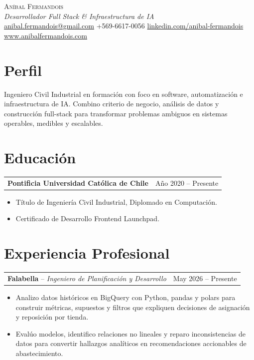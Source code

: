 \documentclass[10pt,letterpaper]{article}
\makeatletter
\newcommand{\entry}[4]{%
  \begin{tabularx}{\linewidth}{@{}Xr@{}}
    \textbf{#1} -- \textit{#2} & {\color{textgray}#3} \\
  \end{tabularx}
  #4
}
\makeatother
\begin{document}
\begin{center}
  {\fontsize{24}{25}\selectfont\scshape Aníbal Fermandois}\\
  \vspace{3pt}
  {\color{accent}\textit{Desarrollador Full Stack \& Infraestructura de IA}}\\
  \vspace{4pt}
  \href{mailto:anibal.fermandois@gmail.com}{anibal.fermandois@gmail.com} \quad
  +569-6617-0056 \quad
  \href{https://www.linkedin.com/in/anibal-fermandois-224ab4262/}{linkedin.com/anibal-fermandois} \quad
  \href{https://www.anibalfermandois.com/}{www.anibalfermandois.com}
\end{center}

\section{Perfil}
Ingeniero Civil Industrial en formación con foco en software, automatización e infraestructura de IA. Combino criterio de negocio, análisis de datos y construcción full-stack para transformar problemas ambiguos en sistemas operables, medibles y escalables.

\section{Educación}
\begin{tabularx}{\linewidth}{@{}Xr@{}}
\textbf{Pontificia Universidad Católica de Chile} & Año 2020 -- Presente \\
\end{tabularx}
\begin{itemize}
  \item Título de Ingeniería Civil Industrial, Diplomado en Computación.
  \item Certificado de Desarrollo Frontend Launchpad.
\end{itemize}

\section{Experiencia Profesional}
\entry{Falabella}{Ingeniero de Planificación y Desarrollo}{May 2026 -- Presente}{
\begin{itemize}
  \item Analizo datos históricos en BigQuery con Python, pandas y polars para construir métricas, supuestos y filtros que expliquen decisiones de asignación y reposición por tienda.
  \item Evalúo modelos, identifico relaciones no lineales y reparo inconsistencias de datos para convertir hallazgos analíticos en recomendaciones accionables de abastecimiento.
\end{itemize}}
\end{document}
